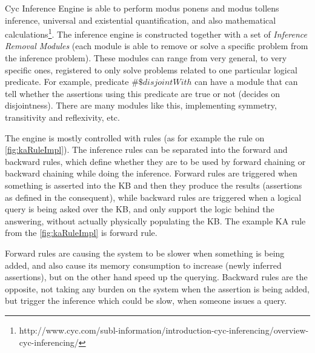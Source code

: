 Cyc Inference Engine is able to perform modus ponens and modus tollens 
inference, universal and existential quantification, and also mathematical 
calculations\footnote{http://www.cyc.com/subl-information/introduction-cyc-inferencing/overview-cyc-inferencing/}. The inference engine is constructed together
with a set of \emph{Inference Removal Modules} (each module is able to remove or
solve a specific problem from the inference problem). These modules can range
from very general, to very specific ones, registered to only solve problems
related to one particular logical predicate. For example, predicate 
$\#\$disjointWith$ can have a module that can tell whether the assertions using
this predicate are true or not (decides on disjointness). There are many
modules like this, implementing symmetry, transitivity and reflexivity, etc.

The engine is mostly controlled with rules (as for example the rule on 
\autoref{fig:kaRuleImpl}). The inference rules can be separated
into the forward and backward rules, which define whether they are to be used
by forward chaining or backward chaining while doing the inference. Forward
rules are triggered when something is asserted into the KB and then they produce
the results (assertions as defined in the consequent), while backward rules
are triggered when a logical query is being asked over the KB, and only support
the logic behind the answering, without actually physically populating the KB.
The example KA rule from the \autoref{fig:kaRuleImpl} is forward rule. 

Forward rules are causing the system to be slower when something is being added,
and also cause its memory consumption to increase (newly inferred assertions),
but on the other hand speed up the querying. Backward rules are the opposite,
not taking any burden on the system when the assertion is being added, but
trigger the inference which could be slow, when someone issues a query.

